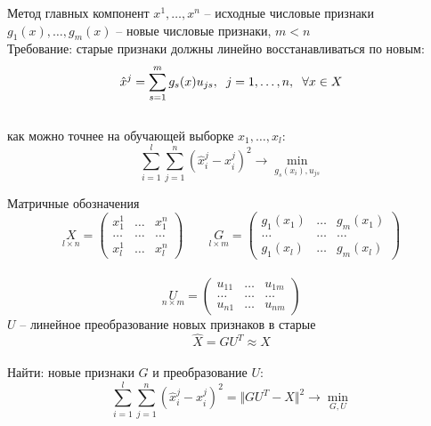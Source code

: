 \documentclass[10pt]{beamer}
\begin{document}
\begin{frame}{Метод главных компонент}
	$x^1, \dots, x^n$ -- исходные числовые признаки\\
	$g_1(x), \dots, g_m(x)$ -- новые числовые признаки, $m < n$\\
	\bigbreak
	\pause
	Требование: старые признаки должны линейно восстанавливаться по новым:\\
	$$\hat{x}^j = \sum\limits_{s=1}^m g_s(x) u_{js} , \hspace{2mm} j = 1,\dots , n, \hspace{2mm} \forall x \in X$$\\
	как можно точнее на обучающей выборке $x_1, \dots, x_l$:\\
	$$\sum\limits_{i=1}^l \sum\limits_{j=1}^n (\hat{x}_i^j - x_i^j)^2 \rightarrow \min\limits_{g_s(x_i), u_{js}}$$
\end{frame}

\begin{frame}{Матричные обозначения}
	$$\underset{l \times n}{X} = \begin{pmatrix}
	  x_1^1 & \dots & x_1^n \\
	  \dots & \dots & \dots\\
	  x_l^1 & \dots & x_l^n
	 \end{pmatrix} \qquad
	 \underset{l \times m}{G} = \begin{pmatrix}
	  g_1(x_1) & \dots & g_m(x_1) \\
	  \dots & \dots & \dots\\
	  g_1(x_l) & \dots & g_m(x_l)
	 \end{pmatrix}$$\\
	 $$\underset{n \times m}{U} = \begin{pmatrix}
	  u_{11} & \dots & u_{1m} \\
	  \dots & \dots & \dots\\
	  u_{n1} & \dots & u_{nm}
	 \end{pmatrix}$$
	$U$ -- линейное преобразование новых признаков в старые\\
	$$\hat{X} = GU^T \approx X$$\\
	\pause
	\alert{Найти:} новые признаки $G$ и преобразование $U$:\\
	$$\sum\limits_{i=1}^l \sum\limits_{j=1}^n (\hat{x}_i^j - x_i^j)^2 = \Vert GU^T - X \Vert^2 \rightarrow \min\limits_{G, U}$$
\end{frame}
\end{document}
